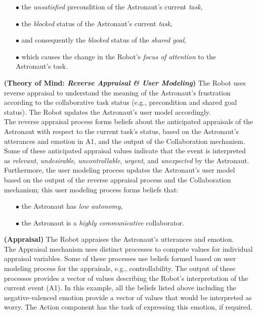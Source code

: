 \begin{itemize}
  \item[$\bullet$] the \textit{unsatisfied} precondition of the Astronaut's
  current \textit{task},
  \item[$\bullet$] the \textit{blocked} status of the Astronaut's current
  \textit{task},
  \item[$\bullet$] and consequently the \textit{blocked} status of the
  \textit{shared goal},
  \item[$\bullet$] which causes the change in the Robot's \textit{focus of
  attention} to the Astronaut's task.
\end{itemize}

\noindent \textbf{(Theory of Mind: \textit{Reverse Appraisal \& User
Modeling})} The Robot uses reverse appraisal to understand the meaning of the
Astronaut's frustration according to the collaborative task status (e.g.,
precondition and shared goal status). The Robot updates the Astronaut's user
model accordingly.\\

The reverse appraisal process forms beliefs about the anticipated appraisals of
the Astronaut with respect to the current task's status, based on the
Astronaut's utterances and emotion in A1, and the output of the Collaboration
mechanism. Some of these anticipated appraisal values indicate that the event is
interpreted as \textit{relevant}, \textit{undesirable}, \textit{uncontrollable},
\textit{urgent}, and \textit{unexpected} by the Astronaut. Furthermore, the user
modeling process updates the Astronaut's user model based on the output of the
reverse appraisal process and the Collaboration mechanism; this user modeling
process forms beliefs that:

\begin{itemize}
  \item[$\bullet$] the Astronaut has \textit{low autonomy},
  \item[$\bullet$] the Astronaut is a \textit{highly communicative}
  collaborator.
\end{itemize}

\noindent \textbf{(Appraisal)} The Robot appraises the Astronaut's utterances
and emotion.\\

The Appraisal mechanism uses distinct processes to compute values for individual
appraisal variables. Some of these processes use beliefs formed based on user
modeling process for the appraisals, e.g., controllability. The output of these
processes provides a vector of values describing the Robot's interpretation of
the current event (A1). In this example, all the beliefs listed above including
the negative-valenced emotion provide a vector of values that would be
interpreted as worry. The Action component has the task of expressing this
emotion, if required.\\

